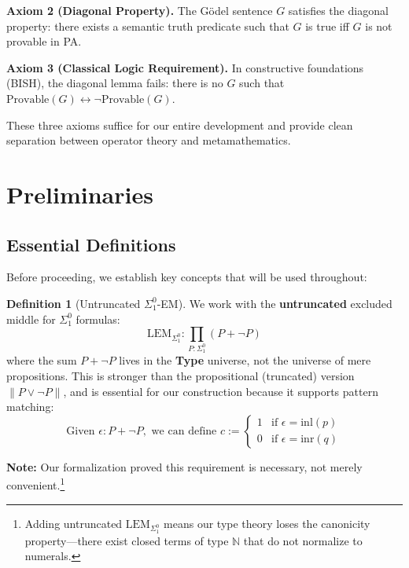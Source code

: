 \documentclass[11pt]{article}
\theoremstyle{definition}
\newtheorem{definition}[theorem]{Definition}
\newcommand{\SigOne}{\Sigma^{0}_{\!1}}
\begin{document}
\begin{mdframed}[roundcorner=4pt]
\textbf{Axiom 2 (Diagonal Property).}
The Gödel sentence $G$ satisfies the diagonal property: there exists a semantic truth predicate such that $G$ is true iff $G$ is not provable in PA.
\end{mdframed}

\begin{mdframed}[roundcorner=4pt]
\textbf{Axiom 3 (Classical Logic Requirement).}
In constructive foundations (BISH), the diagonal lemma fails: there is no $G$ such that $\text{Provable}(G) \leftrightarrow \neg\text{Provable}(G)$.
\end{mdframed}

These three axioms suffice for our entire development and provide clean separation between operator theory and metamathematics.

\section{Preliminaries}

\subsection{Essential Definitions}

Before proceeding, we establish key concepts that will be used throughout:

\begin{definition}[Untruncated $\SigOne$-EM]\label{def:untruncated}
We work with the \textbf{untruncated} excluded middle for $\SigOne$ formulas:
\[
\text{LEM}_{\SigOne} : \prod_{P : \SigOne} (P + \neg P)
\]
where the sum $P + \neg P$ lives in the \textbf{Type} universe, not the universe of mere propositions. This is stronger than the propositional (truncated) version $\|P \lor \neg P\|$, and is essential for our construction because it supports pattern matching:
\[
\text{Given } \epsilon : P + \neg P, \text{ we can define } c := \begin{cases}
1 & \text{if } \epsilon = \mathrm{inl}(p) \\
0 & \text{if } \epsilon = \mathrm{inr}(q)
\end{cases}
\]

\textbf{Note:} Our formalization proved this requirement is necessary, not merely convenient.\footnote{Adding untruncated $\text{LEM}_{\SigOne}$ means our type theory loses the canonicity property—there exist closed terms of type $\mathbb{N}$ that do not normalize to numerals.}
\end{definition}
\end{document}
